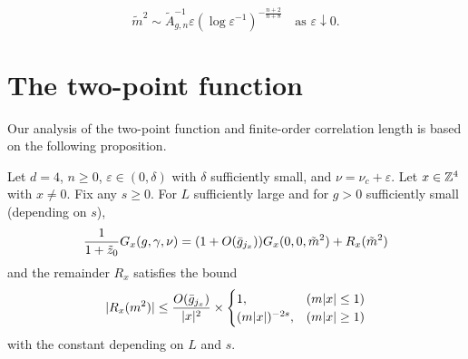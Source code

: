 \begin{equation}
\label{e:mass-epsilon-asympt}
\tilde m^2
	\sim
\tilde A_{g,n}^{-1} \varepsilon (\log \varepsilon^{-1})^{-\frac{n + 2}{n + 8}}
	\quad
\text{as $\varepsilon \downarrow 0$}.
\end{equation}


\section{The two-point function}

Our analysis of the two-point function and finite-order correlation length is
based on the following proposition.

\begin{prop}
\label{prop:R}
Let $d=4$, $n \ge 0$, $\varepsilon \in (0,\delta)$ with $\delta$ sufficiently small,
and $\nu = \nu_c + \varepsilon$.
Let $x \in {\mathbb Z}^4$ with $x \neq 0$.
Fix any $s \geq 0$.
For $L$ sufficiently large and for $g > 0$ sufficiently small (depending on $s$),
\begin{equation}
\label{e:Gab-to-sum-Rqj}
\frac{1}{1+\tilde z_0} G_x(g, \gamma, \nu)
	=
(1 + O(\bar{g}_{j_x})) G_x(0, 0, \tilde m^2) + R_x(\tilde m^2)
\end{equation}
and the remainder $R_x$ satisfies the bound
\begin{equation}
\label{e:Rab-bound}
|R_{x}(m^2)|
	\le
\frac{O(\bar{g}_{j_{x}}) }{|x|^2}
	\times
\begin{cases}
1,				& (m|x|\le 1) \\
(m|x|)^{-2s},	& (m|x|\ge 1)
\end{cases}
\end{equation}
with the  constant depending on $L$ and $s$.
\end{prop}

